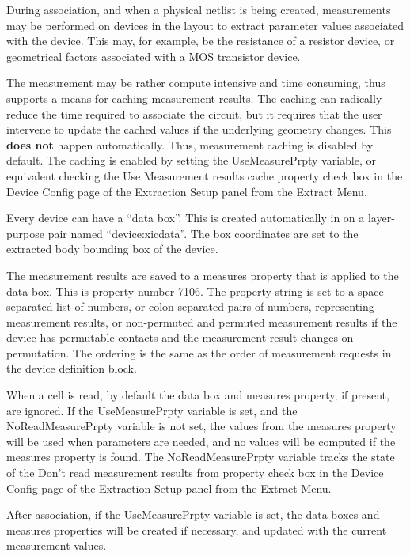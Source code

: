 During association, and when a physical netlist is being created,
measurements may be performed on devices in the layout to extract
parameter values associated with the device.  This may, for example,
be the resistance of a resistor device, or geometrical factors
associated with a MOS transistor device.

The measurement may be rather compute intensive and time consuming,
thus {\Xic} supports a means for caching measurement results.  The
caching can radically reduce the time required to associate the
circuit, but it requires that the user intervene to update the cached
values if the underlying geometry changes.  This {\bf does not} happen
automatically.  Thus, measurement caching is disabled by default.  The
caching is enabled by setting the {\et UseMeasurePrpty} variable, or
equivalent checking the {\cb Use Measurement results cache property}
check box in the {\cb Device Config} page of the {\cb Extraction
Setup} panel from the {\cb Extract Menu}.

Every device can have a ``data box''.  This is created automatically
in {\Xic} on a layer-purpose pair named ``{\vt device:xicdata}''.  The
box coordinates are set to the extracted body bounding box of the
device.

The measurement results are saved to a {\et measures} property that is
applied to the data box.  This is property number 7106.  The property
string is set to a space-separated list of numbers, or colon-separated
pairs of numbers, representing measurement results, or non-permuted
and permuted measurement results if the device has permutable contacts
and the measurement result changes on permutation.  The ordering is
the same as the order of measurement requests in the device definition
block.

When a cell is read, by default the data box and {\et measures}
property, if present, are ignored.  If the {\et UseMeasurePrpty}
variable is set, and the {\et NoReadMeasurePrpty} variable is not set,
the values from the {\et measures} property will be used when
parameters are needed, and no values will be computed if the {\et
measures} property is found.  The {\et NoReadMeasurePrpty} variable
tracks the state of the {\cb Don't read measurement results from
property} check box in the {\cb Device Config} page of the {\cb
Extraction Setup} panel from the {\cb Extract Menu}.

After association, if the {\et UseMeasurePrpty} variable is set, the
data boxes and {\et measures} properties will be created if necessary,
and updated with the current measurement values.

